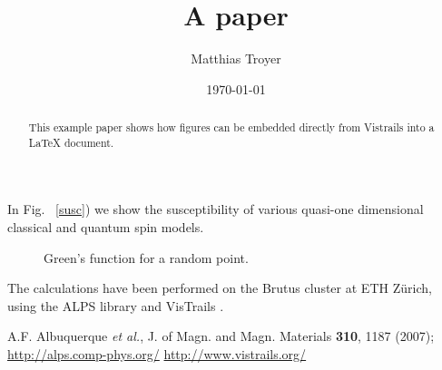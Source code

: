 \documentclass[prl, superscriptaddress, showpacs, twocolumn]{revtex4}
\begin{document}
\title{A paper}
\author{Matthias Troyer}
\date{\today}

\begin{abstract}
This example paper shows how figures can be embedded directly from Vistrails into a LaTeX document.
\end{abstract}


\hyphenation{}

\maketitle

In Fig. ~\ref{susc}) we show the susceptibility of various quasi-one dimensional classical and quantum spin models.

\begin{figure}[h!]
\begin{center}
\vistrail[host=alps.ethz.ch,
db=vistrails,
vtid=3,
version=220,
tag=nice figure,
showspreadsheetonly]{}
\caption{Green's function for a random point.}
\label{green}
\end{center}
\end{figure}


\acknowledgments

The calculations have been performed on the Brutus  cluster at ETH Z{\"u}rich, using the ALPS library \cite{ALPS} and VisTrails  \cite{VisTrails} .

\begin{thebibliography}{9}
 A.F. Albuquerque {\it et al.}, J. of Magn. and Magn. Materials {\bf 310}, 1187 (2007); \url{http://alps.comp-phys.org/}
  \url{http://www.vistrails.org/}
\end{thebibliography}
\end{document}
